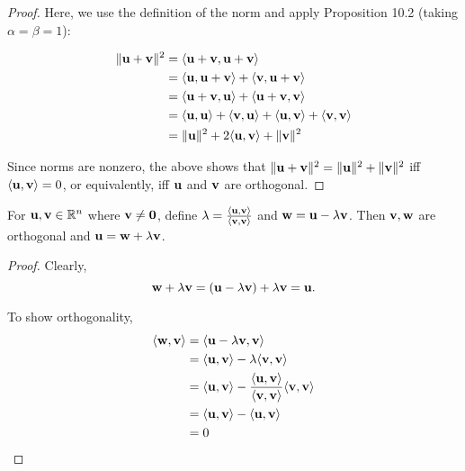 \documentclass[letterpaper, twoside, 12pt]{book}
\begin{document}
\begin{proof}
    Here, we use the definition of the norm and apply Proposition 10.2
    (taking \(\alpha = \beta = 1\)):

    \begin{align*}
         \|\mathbf u + \mathbf v \|^2 &= \langle \mathbf u + \mathbf v , \mathbf u + \mathbf v \rangle \\
                    &= \langle\mathbf u, \mathbf u + \mathbf v \rangle + \langle\mathbf v, \mathbf u + \mathbf v \rangle \\
                    &= \langle\mathbf u + \mathbf v, \mathbf u \rangle + \langle\mathbf u + \mathbf v, \mathbf v \rangle \\
                    &= \langle\mathbf u, \mathbf u \rangle + \langle\mathbf v, \mathbf u\rangle + \langle\mathbf u, \mathbf v\rangle + \langle\mathbf v, \mathbf v\rangle \\
                    &= \| \mathbf u \|^2 + 2 \langle \mathbf u, \mathbf v \rangle + \| \mathbf v \|^2 \\
    \end{align*}

    Since norms are nonzero, the above shows that 
    \(\|\mathbf u + \mathbf v\|^2 = \|\mathbf u\|^2 + \|\mathbf v\|^2 \)
    iff \(\langle \mathbf u, \mathbf v\rangle = 0\), or equivalently, iff \(\mathbf u\) and 
    \(\mathbf v\) are orthogonal.
\end{proof}



\begin{lemma}[10.5]
  For \(\mathbf u,\mathbf v\in\mathbb R^n\) where \(\mathbf v\not=\mathbf 0\),
  define \(\lambda=\frac{\langle\mathbf u,\mathbf v\rangle}{\langle\mathbf v,\mathbf v\rangle}\)
  and \(\mathbf w=\mathbf u-\lambda\mathbf v\). Then \(\mathbf v,\mathbf w\)
  are orthogonal and \(\mathbf u=\mathbf w+\lambda\mathbf v\).
\end{lemma}

\begin{proof}
    Clearly, 
    \[ \mathbf w + \lambda \mathbf v = (\mathbf u - \lambda \mathbf v) + \lambda \mathbf v = \mathbf u .\]
    
    To show orthogonality,
    \begin{align*} 
        \langle \mathbf w, \mathbf v \rangle &= \langle \mathbf u - \lambda \mathbf v , \mathbf v \rangle \\
                    &= \langle \mathbf u, \mathbf v\rangle - \lambda \langle\mathbf v, \mathbf v \rangle \\
                    &= \langle \mathbf u, \mathbf v\rangle - \frac{\langle\mathbf u, \mathbf v\rangle}{\langle\mathbf v, \mathbf v\rangle} \langle \mathbf v, \mathbf v \rangle \\
                    &= \langle \mathbf u, \mathbf v\rangle - \langle \mathbf u, \mathbf v \rangle \\
                    &= 0
    \end{align*}

\end{proof}
\end{document}
